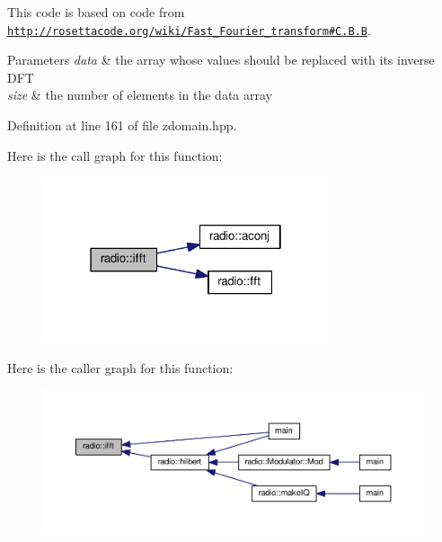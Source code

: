 This code is based on code from \href{http://rosettacode.org/wiki/Fast_Fourier_transform#C.2B.2B}{\tt http\+://rosettacode.\+org/wiki/\+Fast\+\_\+\+Fourier\+\_\+transform\#\+C.\+B.\+B}.


\begin{DoxyParams}{Parameters}
{\em data} & the array whose values should be replaced with its inverse D\+F\+T\\
\hline
{\em size} & the number of elements in the data array \\
\hline
\end{DoxyParams}


Definition at line 161 of file zdomain.\+hpp.



Here is the call graph for this function\+:
\nopagebreak
\begin{figure}[H]
\begin{center}
\leavevmode
\includegraphics[width=238pt]{namespaceradio_a51add4e2faf6d58cabc3b4a3892420eb_cgraph}
\end{center}
\end{figure}




Here is the caller graph for this function\+:
\nopagebreak
\begin{figure}[H]
\begin{center}
\leavevmode
\includegraphics[width=350pt]{namespaceradio_a51add4e2faf6d58cabc3b4a3892420eb_icgraph}
\end{center}
\end{figure}


